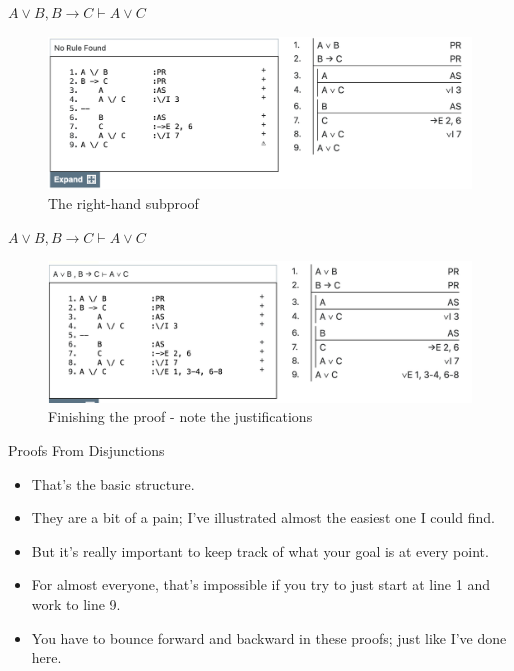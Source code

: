 \documentclass[
  ignorenonframetext,
]{beamer}
\providecommand{\tightlist}{%
  \setlength{\itemsep}{0pt}\setlength{\parskip}{0pt}}
\renewcommand{\,}{\text{, }}
\begin{document}
\begin{frame}{\(A \vee B, B \rightarrow C \vdash A \vee C\)}
\protect\hypertarget{a-vee-b-b-rightarrow-c-vdash-a-vee-c-5}{}
\begin{figure}
\centering
\includegraphics[width=\textwidth,height=0.75\textheight]{5_5d.png}
\caption{The right-hand subproof}
\end{figure}
\end{frame}

\begin{frame}{\(A \vee B, B \rightarrow C \vdash A \vee C\)}
\protect\hypertarget{a-vee-b-b-rightarrow-c-vdash-a-vee-c-6}{}
\begin{figure}
\centering
\includegraphics[width=\textwidth,height=0.75\textheight]{5_5e.png}
\caption{Finishing the proof - note the justifications}
\end{figure}
\end{frame}

\begin{frame}{Proofs From Disjunctions}
\protect\hypertarget{proofs-from-disjunctions}{}
\begin{itemize}
\tightlist
\item
  That's the basic structure.
\item
  They are a bit of a pain; I've illustrated almost the easiest one I
  could find.
\item
  But it's really important to keep track of what your goal is at every
  point.
\item
  For almost everyone, that's impossible if you try to just start at
  line 1 and work to line 9.
\item
  You have to bounce forward and backward in these proofs; just like
  I've done here.
\end{itemize}
\end{frame}
\end{document}
